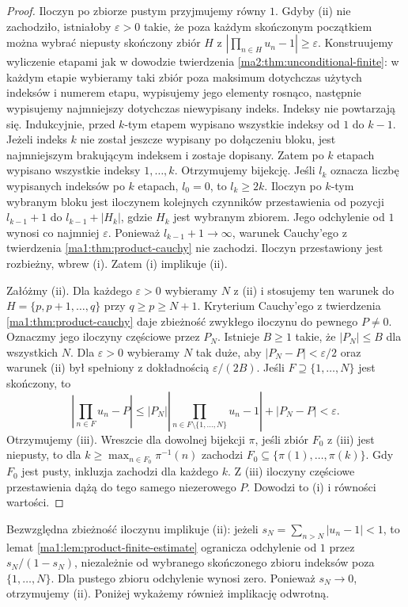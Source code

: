 \begin{proof}
Iloczyn po zbiorze pustym przyjmujemy równy $1$.
Gdyby (ii) nie zachodziło, istniałoby $\varepsilon>0$
takie, że poza każdym skończonym początkiem można wybrać
niepusty skończony zbiór $H$ z
$|\prod_{n\in H}u_n-1|\ge\varepsilon$.
Konstruujemy wyliczenie etapami jak w dowodzie twierdzenia
\ref{ma2:thm:unconditional-finite}: w każdym etapie
wybieramy taki zbiór poza maksimum dotychczas użytych
indeksów i numerem etapu, wypisujemy jego elementy
rosnąco, następnie wypisujemy najmniejszy dotychczas
niewypisany indeks. Indeksy nie powtarzają się. Indukcyjnie, przed
$k$-tym etapem wypisano wszystkie indeksy od $1$ do
$k-1$. Jeżeli indeks $k$ nie został jeszcze wypisany
po dołączeniu bloku, jest najmniejszym brakującym
indeksem i zostaje dopisany. Zatem po $k$ etapach
wypisano wszystkie indeksy $1,\ldots,k$. Otrzymujemy bijekcję.
Jeśli $l_k$ oznacza liczbę wypisanych indeksów po
$k$ etapach, $l_0=0$, to $l_k\ge2k$. Iloczyn po
$k$-tym wybranym bloku jest iloczynem kolejnych
czynników przestawienia od pozycji $l_{k-1}+1$ do
$l_{k-1}+|H_k|$, gdzie $H_k$ jest wybranym zbiorem.
Jego odchylenie od $1$ wynosi co najmniej $\varepsilon$.
Ponieważ $l_{k-1}+1\to\infty$, warunek Cauchy'ego
z twierdzenia \ref{ma1:thm:product-cauchy} nie zachodzi.
Iloczyn przestawiony jest rozbieżny, wbrew (i).
Zatem (i) implikuje (ii).

Załóżmy (ii). Dla każdego $\varepsilon>0$ wybieramy
$N$ z (ii) i stosujemy ten warunek do
$H=\{p,p+1,\ldots,q\}$ przy $q\ge p\ge N+1$.
Kryterium Cauchy'ego z twierdzenia
\ref{ma1:thm:product-cauchy} daje zbieżność zwykłego
iloczynu do pewnego $P\ne0$. Oznaczmy jego iloczyny
częściowe przez $P_N$. Istnieje $B\ge1$ takie, że
$|P_N|\le B$ dla wszystkich $N$.
Dla $\varepsilon>0$ wybieramy $N$ tak duże, aby
$|P_N-P|<\varepsilon/2$ oraz warunek (ii) był spełniony
z dokładnością $\varepsilon/(2B)$.
Jeśli $F\supseteq\{1,\ldots,N\}$ jest skończony, to
\[
 \left|\prod_{n\in F}u_n-P\right|
 \le |P_N|\left|\prod_{n\in F\setminus\{1,\ldots,N\}}u_n-1\right|
      +|P_N-P|<\varepsilon.
\]
Otrzymujemy (iii).
Wreszcie dla dowolnej bijekcji $\pi$, jeśli zbiór
$F_0$ z (iii) jest niepusty, to dla
$k\ge\max_{n\in F_0}\pi^{-1}(n)$ zachodzi
$F_0\subseteq\{\pi(1),\ldots,\pi(k)\}$. Gdy $F_0$
jest pusty, inkluzja zachodzi dla każdego $k$. Z (iii) iloczyny częściowe
przestawienia dążą do tego samego niezerowego $P$.
Dowodzi to (i) i równości wartości.
\end{proof}

\begin{uwaga}
Bezwzględna zbieżność iloczynu implikuje (ii):
jeżeli $s_N=\sum_{n>N}|u_n-1|<1$, to lemat
\ref{ma1:lem:product-finite-estimate} ogranicza
odchylenie od $1$ przez $s_N/(1-s_N)$, niezależnie
od wybranego skończonego zbioru indeksów poza
$\{1,\ldots,N\}$. Dla pustego zbioru odchylenie wynosi
zero. Ponieważ $s_N\to0$, otrzymujemy (ii).
Poniżej wykażemy również implikację odwrotną.
\end{uwaga}

